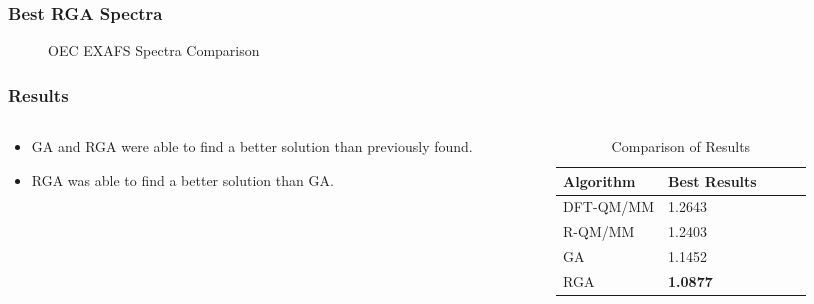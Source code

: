 \documentclass[10pt]{beamer}
\begin{document}
\begin{frame}
	\frametitle{Best RGA Spectra}

	\begin{figure}
		\caption{OEC EXAFS Spectra Comparison}
	\end{figure}

\end{frame}

\begin{frame}
	\frametitle{Results}

	\begin{columns}[T]
		\begin{column}{.5\textwidth}
			\begin{itemize}
				\item GA and RGA were able to find a better solution than previously found.
				\item RGA was able to find a better solution than GA.
			\end{itemize}
		\end{column}
		\begin{column}{.5\textwidth}
			\begin{table}
				\caption{Comparison of Results}
				\begin{tabular}{ | l | l | l | l | l | }
				  \hline
				    Algorithm & Best Results \\ \hline
				    DFT-QM/MM & 1.2643 \\ \hline
				    R-QM/MM & 1.2403 \\ \hline
				    GA & 1.1452 \\ \hline
				    RGA & \textbf{1.0877} \\ \hline
				\end{tabular}
			\end{table}
		\end{column}
	\end{columns}

\end{frame}
\end{document}
